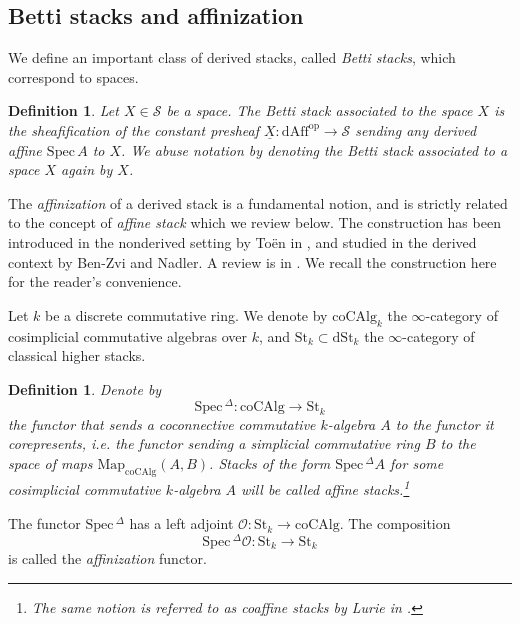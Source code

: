 \documentclass[11pt,letterpaper]{amsart}
\newtheorem{definition}[dummy]{Definition}
\newcommand{\cS}{\mathcal{S}}
\newcommand{\cO}{\mathcal{O}}
\newcommand{\op}{\mathrm{op}}
\newcommand{\dSt}{\mathrm{dSt}}
\newcommand{\dAff}{\mathrm{dAff}}
\newcommand{\Spec}{\mathrm{S}\mathrm{pec}\,}
\newcommand{\coCAlg}{\mathrm{coCAlg}}
\begin{document}
\subsection{Betti stacks and affinization}\label{subsection:affinization}
We define an important class of derived stacks, called \emph{Betti stacks}, which correspond to spaces. 
\begin{definition}
Let $X\in\cS$ be a space.
The \emph{Betti stack} associated to the space $X$ is the sheafification of the constant presheaf $\underline{X}:\dAff^\op\rightarrow\cS$ sending any derived affine $\Spec A$ to $X$. We abuse notation by denoting the Betti stack associated to a space $X$ again by $X$. 
\end{definition}

The \emph{affinization} of a derived stack is a fundamental notion, and is strictly related to the concept of \emph{affine stack} which we review below. The construction has been introduced in the nonderived setting by To\"en in \cite{ToenPhD}, and studied in the derived context by Ben-Zvi and Nadler. A review is in \cite{MRT}. We recall the construction here for the reader's convenience. 


Let $k$ be a discrete commutative ring. We denote by $\coCAlg_k$ the $\infty$-category of cosimplicial commutative algebras over $k$, and $\mathrm{St}_k\subset\dSt_k$ the $\infty$-category of classical higher stacks.
\begin{definition}
Denote by 
\begin{equation*}
\Spec^{\Delta}:\coCAlg\rightarrow\mathrm{St}_k
\end{equation*}
the functor that sends a coconnective commutative $k$-algebra $A$ to the functor it corepresents, i.e. the functor sending a simplicial commutative ring $B$ to the space of maps $\mathrm{Map}_{\coCAlg}(A,B)$. Stacks of the form $\Spec^{\Delta}A$ for some cosimplicial commutative $k$-algebra $A$ will be called \emph{affine stacks}.\footnote{The same notion is referred to as \emph{coaffine stacks} by Lurie in \cite{DAGVIII}.}
\end{definition}
The functor $\Spec^{\Delta}$ has a left adjoint $\cO:\mathrm{St}_k\rightarrow\coCAlg$. The composition $$\Spec^{\Delta}\cO:\mathrm{St}_k\rightarrow\mathrm{St}_k$$ is called the \emph{affinization} functor.
 
\end{document}
